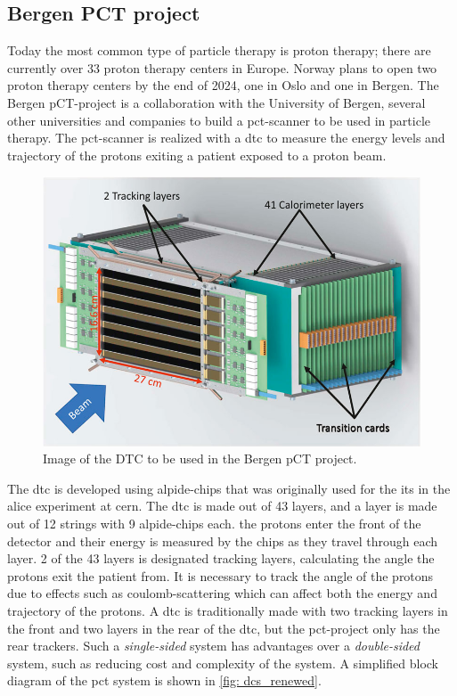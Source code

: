 \documentclass[main.tex]{subfiles}
\begin{document}
\subsection{Bergen PCT project}
Today the most common type of particle therapy is proton therapy; there are currently over 33 proton therapy centers in Europe. Norway plans to open two proton therapy centers by the end of 2024, one in Oslo and one in Bergen. The Bergen pCT-project is a collaboration with the University of Bergen, several other universities and companies to build a \gls{pct}-scanner to be used in particle therapy. The \gls{pct}-scanner is realized with a \gls{dtc} to measure the energy levels and trajectory of the protons exiting a patient exposed to a proton beam.

\begin{figure}[!ht]
    \centering
    \includegraphics[scale = 0.5]{images/dtc.jpg}
    \caption{Image of the DTC to be used in the Bergen pCT project.}
    \label{fig: rt_intro}
\end{figure}
\FloatBarrier

The \gls{dtc} is developed using \gls{alpide}-chips that was originally used for the \gls{its} in the \acrshort{alice} experiment at \acrshort{cern}. The \gls{dtc} is made out of 43 layers, and a layer is made out of 12 strings with 9 \gls{alpide}-chips each. the protons enter the front of the detector and their energy is measured by the chips as they travel through each layer. 2 of the 43 layers is designated tracking layers, calculating the angle the protons exit the patient from. It is necessary to track the angle of the protons due to effects such as coulomb-scattering which can affect both the energy and trajectory of the protons. A \gls{dtc} is traditionally made with two tracking layers in the front and two layers in the rear of the \gls{dtc}, but the \gls{pct}-project only has the rear trackers. Such a \textit{single-sided} system has advantages over a \textit{double-sided} system, such as reducing cost and complexity of the system. A simplified block diagram of the \gls{pct} system is shown in \autoref{fig: dcs_renewed}.
\end{document}
